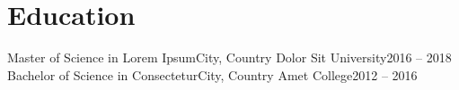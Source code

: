 
\section{Education}
\resumeSubHeadingListStart
\resumeSubheading
{Master of Science in Lorem Ipsum}{City, Country}
{Dolor Sit University}{2016 -- 2018}
\resumeSubheading
{Bachelor of Science in Consectetur}{City, Country}
{Amet College}{2012 -- 2016}
\resumeSubHeadingListEnd

